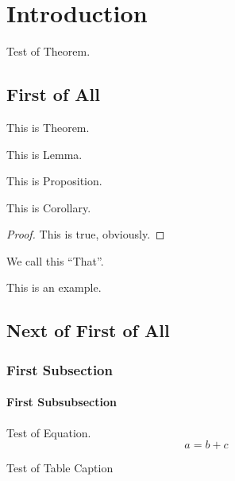 \documentclass[a4j,12pt,oneside,openany,english]{jsbook}
\begin{document}
\chapter{Introduction}
Test of Theorem.

\section{First of All}

\begin{theorem}
This is Theorem.
\end{theorem}

\begin{lemma}
This is Lemma.
\end{lemma}

\begin{proposition}
This is Proposition.
\end{proposition}

\begin{corollary}
This is Corollary.
\end{corollary}

\begin{proof}
This is true, obviously.
\end{proof}

\begin{definition}
We call this ``That''.
\end{definition}

\begin{example}
This is an example.
\end{example}

\section{Next of First of All}
\subsection{First Subsection}
\subsubsection{First Subsubsection}

Test of Equation.
\begin{equation}
	a = b + c
\end{equation}

\begin{table}
	\caption{Test of Table Caption}
\end{table}
\end{document}

